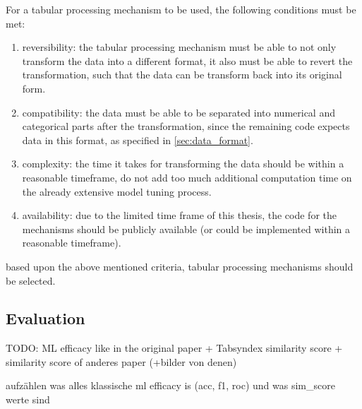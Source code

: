 For a tabular processing mechanism to be used, the following conditions must be met:

\begin{enumerate}
    \item reversibility: the tabular processing mechanism must be able to not only transform the data into a different format, it also must be able to revert the transformation,
    such that the data can be transform back into its original form.
    \item compatibility: the data must be able to be separated into numerical and categorical parts after the transformation,
    since the remaining code expects data in this format, as specified in \autoref{sec:data_format}.
    \item complexity: the time it takes for transforming the data should be within a reasonable timeframe, do not add too much additional computation time on the already extensive model tuning process.
    \item availability: due to the limited time frame of this thesis, the code for the mechanisms should be publicly available (or could be implemented within a reasonable timeframe).
\end{enumerate}

based upon the above mentioned criteria, tabular processing mechanisms should be selected.


\subsection[]{Evaluation}
\label{ch:conceptualDesign-Evaluation}
TODO:
ML efficacy like in the original paper + Tabsyndex similarity score + similarity score of anderes paper (+bilder von denen)

aufzählen was alles klassische ml efficacy is (acc, f1, roc) und was sim_score werte sind